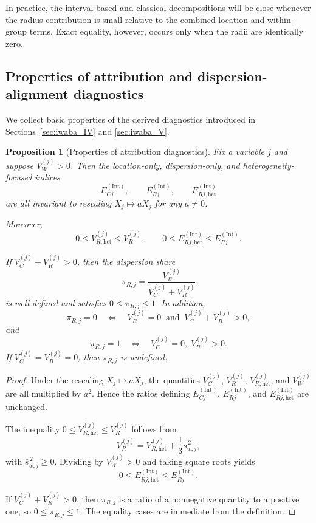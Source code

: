 \documentclass[preprint, times, 12pt, authoryear]{elsarticle}
\newtheorem{proposition}[theorem]{Proposition}
\begin{document}
 In practice, the interval-based and classical decompositions will be close whenever the radius contribution is small relative to the combined location and within-group terms. Exact equality, however, occurs only when the radii are identically zero.

 
 \subsection{Properties of attribution and dispersion-alignment diagnostics}\label{sec:disp_diag_theory}
 
 We collect basic properties of the derived diagnostics introduced in Sections~\ref{sec:iwaba_IV} and \ref{sec:iwaba_V}.
 
 \begin{proposition}[Properties of attribution diagnostics]\label{prop:level4_props}
 	Fix a variable $j$ and suppose $V_W^{(j)}>0$. Then the location-only, dispersion-only, and heterogeneity-focused indices
 	\[
 	E_{Cj}^{(\mathrm{Int})},
 	\qquad
 	E_{Rj}^{(\mathrm{Int})},
 	\qquad
 	E_{Rj,\mathrm{het}}^{(\mathrm{Int})}
 	\]
 	are all invariant to rescaling $X_j\mapsto aX_j$ for any $a\neq 0$.
 	
 	Moreover,
 	\[
 	0\le V_{R,\mathrm{het}}^{(j)}\le V_R^{(j)},
 	\qquad
 	0\le E_{Rj,\mathrm{het}}^{(\mathrm{Int})}\le E_{Rj}^{(\mathrm{Int})}.
 	\]
 	
 	If $V_C^{(j)}+V_R^{(j)}>0$, then the dispersion share
 	\[
 	\pi_{R,j}=\frac{V_R^{(j)}}{V_C^{(j)}+V_R^{(j)}}
 	\]
 	is well defined and satisfies $0\le \pi_{R,j}\le 1$. In addition,
 	\[
 	\pi_{R,j}=0
 	\quad\Longleftrightarrow\quad
 	V_R^{(j)}=0 \ \text{ and } \ V_C^{(j)}+V_R^{(j)}>0,
 	\]
 	and
 	\[
 	\pi_{R,j}=1
 	\quad\Longleftrightarrow\quad
 	V_C^{(j)}=0,\; V_R^{(j)}>0.
 	\]
 	If $V_C^{(j)}=V_R^{(j)}=0$, then $\pi_{R,j}$ is undefined.
 \end{proposition}
 
 \begin{proof}
 	Under the rescaling $X_j\mapsto aX_j$, the quantities $V_C^{(j)}$, $V_R^{(j)}$, $V_{R,\mathrm{het}}^{(j)}$, and $V_W^{(j)}$ are all multiplied by $a^2$. Hence the ratios defining $E_{Cj}^{(\mathrm{Int})}$, $E_{Rj}^{(\mathrm{Int})}$, and $E_{Rj,\mathrm{het}}^{(\mathrm{Int})}$ are unchanged.
 	
 	The inequality $0\le V_{R,\mathrm{het}}^{(j)}\le V_R^{(j)}$ follows from
 	\[
 	V_R^{(j)}=V_{R,\mathrm{het}}^{(j)}+\frac13\bar s_{w,j}^{\,2},
 	\]
 	with $\bar s_{w,j}^{\,2}\ge 0$. Dividing by $V_W^{(j)}>0$ and taking square roots yields
 	\[
 	0\le E_{Rj,\mathrm{het}}^{(\mathrm{Int})}\le E_{Rj}^{(\mathrm{Int})}.
 	\]
 	
 	If $V_C^{(j)}+V_R^{(j)}>0$, then $\pi_{R,j}$ is a ratio of a nonnegative quantity to a positive one, so $0\le \pi_{R,j}\le 1$. The equality cases are immediate from the definition.
 \end{proof}
 
\end{document}
